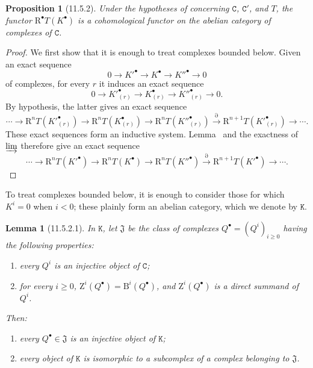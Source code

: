 \documentclass[oneside]{amsart}
\theoremstyle{ega-env-style}
\theoremstyle{ega-thm-env-style}
\newtheorem*{proposition}{Proposition}
\newtheorem*{lemma}{Lemma}
\theoremstyle{ega-defn-env-style}
\def\cat{\mathtt}                   %
\def\geq{\geqslant}                 %
\def\RR{\mathrm{R}}                 %
\newcommand{\oldpage}[2][]{{\marginnote{\normalfont{\textbf{#1}~|~#2}}}\ignorespaces}
\let\EGAOriginalLabel\label
\renewcommand{\label}[1]{\phantomsection\EGAOriginalLabel{#1}}
\begin{document}
\begin{proposition}[11.5.2]
\label{0.11.5.2}
Under the hypotheses of  concerning $\cat{C}$, $\cat{C}'$, and $T$, the functor $\RR^\bullet T(K^\bullet)$ is a cohomological functor on the abelian category of complexes of $\cat{C}$.
\end{proposition}

\begin{proof}
We first show that it is enough to treat complexes bounded below.
Given an exact sequence
\[
  0\longrightarrow K'^\bullet\longrightarrow K^\bullet
  \longrightarrow K''^\bullet\longrightarrow 0
\]
of complexes, for every $r$ it induces an exact sequence
\[
  0\longrightarrow K'^\bullet_{(r)}\longrightarrow K^\bullet_{(r)}
  \longrightarrow K''^\bullet_{(r)}\longrightarrow 0.
\]
By hypothesis, the latter gives an exact sequence
\[
  \cdots\longrightarrow\RR^nT(K'^\bullet_{(r)})
  \longrightarrow\RR^nT(K^\bullet_{(r)})
  \longrightarrow\RR^nT(K''^\bullet_{(r)})
  \xrightarrow{\partial}\RR^{n+1}T(K'^\bullet_{(r)})
  \longrightarrow\cdots .
\]
These exact sequences form an inductive system.
Lemma~ and the exactness of $\varinjlim$ therefore give an exact sequence
\[
  \cdots\longrightarrow\RR^nT(K'^\bullet)
  \longrightarrow\RR^nT(K^\bullet)
  \longrightarrow\RR^nT(K''^\bullet)
  \xrightarrow{\partial}\RR^{n+1}T(K'^\bullet)
  \longrightarrow\cdots .
\]
\end{proof}

To treat complexes bounded below, it is enough to consider those for which $K^i=0$ when $i<0$; these plainly form an abelian category, which we denote by $\cat{K}$.

\begin{lemma}[11.5.2.1]
\label{0.11.5.2.1}
In $\cat{K}$, let $\mathfrak{J}$ be the class of complexes $Q^\bullet=(Q^i)_{i\geq0}$ having the
\oldpage[0\textsubscript{III}]{37}
following properties:
\begin{enumerate}
  \item[{\rm(1)}] every $Q^i$ is an injective object of $\cat{C}$;
  \item[{\rm(2)}] for every $i\geq0$, $\mathrm{Z}^i(Q^\bullet)=\mathrm{B}^i(Q^\bullet)$, and $\mathrm{Z}^i(Q^\bullet)$ is a direct summand of $Q^i$.
\end{enumerate}
Then:
\begin{enumerate}
  \item[{\rm(i)}] every $Q^\bullet\in\mathfrak{J}$ is an injective object of $\cat{K}$;
  \item[{\rm(ii)}] every object of $\cat{K}$ is isomorphic to a subcomplex of a complex belonging to $\mathfrak{J}$.
\end{enumerate}
\end{lemma}
\end{document}
